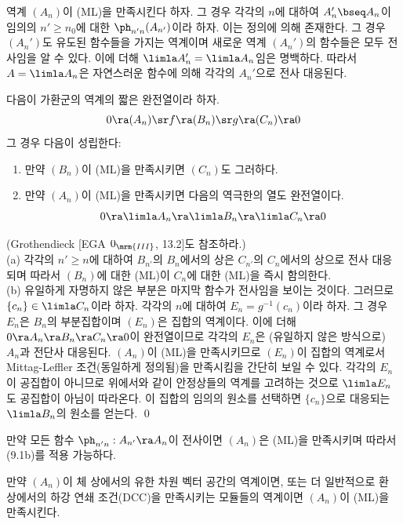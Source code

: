 	역계 $(A_n)$이 (ML)을 만족시킨다 하자. 그 경우 각각의 $n$에 대하여 $A_n'\bseq A_n$이
	임의의 $n'\ge n_0$에 대한  $\ph_{n'n}(A_{n'})$이라 하자. 이는 정의에 의해 존재한다.
	그 경우 $(A_n')$도 유도된 함수들을 가지는 역계이며 새로운 역계 $(A_n')$의 함수들은 모두 전사임을 알 수 있다.
	이에 더해 $\limla A_n'=\limla A_n$임은 명백하다. 따라서 $A=\limla A_n$은 자연스러운 함수에 의해 각각의 $A_n'$으로 전사 대응된다.
	
	
	\begin{proposition}
	다음이 가환군의 역계의 짧은 완전열이라 하자.
	$$0\ra(A_n)\sr f\ra(B_n)\sr g\ra(C_n)\ra0$$
	그 경우 다음이 성립한다:
	\begin{enumerate}[label=(\alph*)]
	\item 만약 $(B_n)$이 (ML)을 만족시키면 $(C_n)$도 그러하다.
	\item 만약 $(A_n)$이 (ML)을 만족시키면 다음의 역극한의 열도 완전열이다.
	$$0\ra\limla A_n\ra\limla B_n\ra\limla C_n\ra 0$$
	\end{enumerate}
	\pf (Grothendieck [EGA $0_{\mrm{III}}$, 13.2]도 참조하라.)\\
	(a) 각각의 $n'\ge n$에 대하여 $B_{n'}$의 $B_n$에서의 상은 $C_{n'}$의 $C_n$에서의 상으로 전사 대응되며
	따라서 $(B_n)$에 대한 (ML)이 $C_n$에 대한 (ML)을 즉시 함의한다.\\
	(b) 유일하게 자명하지 않은 부분은 마지막 함수가 전사임을 보이는 것이다. 그러므로 $\{c_n\}\in\limla C_n$이라 하자.
	각각의 $n$에 대하여 $E_n=g^{-1}(c_n)$이라 하자. 그 경우 $E_n$은 $B_n$의 부분집합이며 $(E_n)$은 집합의 역계이다.
	이에 더해 $0\ra A_n\ra B_n\ra C_n\ra 0$이 완전열이므로 각각의 $E_n$은 (유일하지 않은 방식으로) $A_n$과 전단사 대응된다.
	$(A_n)$이 (ML)을 만족시키므로 $(E_n)$이 집합의 역계로서 Mittag-Leffler 조건(동일하게 정의됨)을 만족시킴을 간단히 보일 수 있다.
	각각의 $E_n$이 공집합이 아니므로 위에서와 같이 안정상들의 역계를 고려하는 것으로 $\limla E_n$도 공집합이 아님이 따라온다.
	이 집합의 임의의 원소를 선택하면 $\{c_n\}$으로 대응되는 $\limla B_n$의 원소를 얻는다.
	\qed
	\end{proposition}
	
	
	\begin{example}
	만약 모든 함수 $\ph_{n'n}:A_{n'}\ra A_n$이 전사이면 $(A_n)$은 (ML)을 만족시키며 따라서 (9.1b)를 적용 가능하다.
	\end{example}
	
	
	\begin{example}
	만약 $(A_n)$이 체 상에서의 유한 차원 벡터 공간의 역계이면,
	또는 더 일반적으로 환 상에서의 하강 연쇄 조건(DCC)을 만족시키는 모듈들의 역계이면 $(A_n)$이 (ML)을 만족시킨다.
	\end{example}
	
